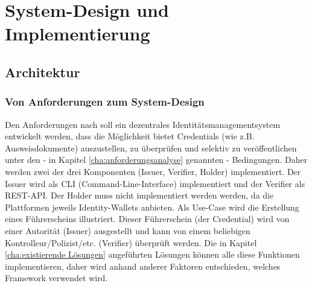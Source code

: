 \chapter{System-Design und Implementierung}
\label{cha:systemdesign}

\section{Architektur}

\subsection{Von Anforderungen zum System-Design}
Den Anforderungen nach soll ein dezentrales Identitätsmanagementsystem entwickelt werden, dass die Möglichkeit bietet Credentials (wie z.B. Ausweisdokumente) auszustellen, zu überprüfen und selektiv zu veröffentlichen unter den - in Kapitel \ref{cha:anforderungsanalyse} genannten - Bedingungen. Daher werden zwei der drei Komponenten (Issuer, Verifier, Holder) implementiert. Der Issuer wird als CLI (Command-Line-Interface) implementiert und der Verifier als REST-API. Der Holder muss nicht implementiert werden werden, da die Plattformen jeweils Identity-Wallets anbieten. Als Use-Case wird die Erstellung eines Führerscheins illustriert. Dieser Führerschein (der Credential) wird von einer Autorität (Issuer) ausgestellt und kann von einem beliebigen Kontrolleur/Polizist/etc. (Verifier) überprüft werden.
Die in Kapitel \ref{cha:existierende Lösungen} angeführten Lösungen können alle diese Funktionen implementieren, daher wird anhand anderer Faktoren entschieden, welches Framework verwendet wird.

